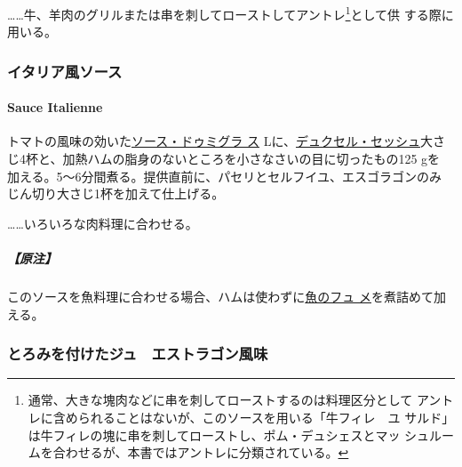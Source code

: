 \ldots{}\ldots{}牛、羊肉のグリルまたは串を刺してローストしてアントレ\footnote{通常、大きな塊肉などに串を刺してローストするのは料理区分として
  アントレに含められることはないが、このソースを用いる「牛フィレ　ユ
  サルド」は牛フィレの塊に串を刺してローストし、ポム・デュシェスとマッ
  シュルームを合わせるが、本書ではアントレに分類されている。}として供
する際に用いる。

\maeaki

\hypertarget{ux30a4ux30bfux30eaux30a2ux98a8ux30bdux30fcux30b9}{%
\subsubsection{イタリア風ソース}\label{ux30a4ux30bfux30eaux30a2ux98a8ux30bdux30fcux30b9}}

\hypertarget{sauce-italienne}{%
\paragraph{Sauce Italienne}\label{sauce-italienne}}

   

トマトの風味の効いた\protect\hyperlink{sauce-demi-glace}{ソース・ドゥミグラ
ス}\troisquarts{} Lに、\href{}{デュクセル・セッシュ}大さ
じ4杯と、加熱ハムの脂身のないところを小さなさいの目に切ったもの125 gを
加える。5〜6分間煮る。提供直前に、パセリとセルフイユ、エスゴラゴンのみ
じん切り大さじ1杯を加えて仕上げる。

\ldots{}\ldots{}いろいろな肉料理に合わせる。

\hypertarget{ux539fux6ce8-4}{%
\subparagraph{【原注】}\label{ux539fux6ce8-4}}

このソースを魚料理に合わせる場合、ハムは使わずに\protect\hyperlink{fumet-de-poisson}{魚のフュ
メ}を煮詰めて加える。

\maeaki

\hypertarget{ux3068ux308dux307fux3092ux4ed8ux3051ux305fux30b8ux30e5ux30a8ux30b9ux30c8ux30e9ux30b4ux30f3ux98a8ux5473}{%
\subsubsection{とろみを付けたジュ　エストラゴン風味}\label{ux3068ux308dux307fux3092ux4ed8ux3051ux305fux30b8ux30e5ux30a8ux30b9ux30c8ux30e9ux30b4ux30f3ux98a8ux5473}}


